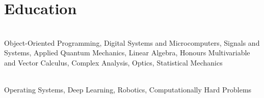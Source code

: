 \documentclass[]{deedy-resume-openfont}
\begin{document}
\section{Education}

\begin{adjustwidth}{0.55cm}{1.25cm}
	 \\
	 Object-Oriented Programming, Digital Systems and Microcomputers, Signals and Systems, Applied Quantum Mechanics, Linear Algebra, Honours Multivariable and Vector Calculus, Complex Analysis, Optics, Statistical Mechanics
\end{adjustwidth}

\vspace{8pt}

\begin{adjustwidth}{0.55cm}{1.25cm}
	 \\
	 Operating Systems, Deep Learning, Robotics, Computationally Hard Problems
\end{adjustwidth}

\vspace{10pt}
\end{document}
